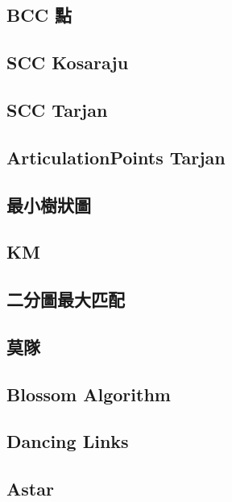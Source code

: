     \subsection{BCC 點}
        
    \subsection{SCC Kosaraju}
         \columnbreak
    \subsection{SCC Tarjan}
         \columnbreak
    \subsection{ArticulationPoints Tarjan}
         \columnbreak
    \subsection{最小樹狀圖}
         \columnbreak
    \subsection{KM}
        
    \subsection{二分圖最大匹配}
        
    \subsection{莫隊}
         \columnbreak
    \subsection{Blossom Algorithm}
        
    \subsection{Dancing Links}
         \columnbreak
    \subsection{Astar}
        
